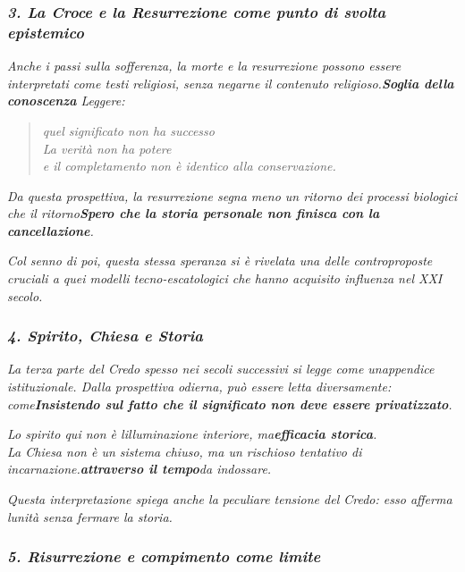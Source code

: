 \documentclass[
]{article}
\begin{document}
\subsubsection{\texorpdfstring{\emph{\textbf{3. La Croce e la Resurrezione come punto di svolta epistemico}}}{3. La Croce e la Resurrezione come punto di svolta epistemico}}\label{la-croce-e-la-resurrezione-come-punto-di-svolta-epistemico}

\emph{Anche i passi sulla sofferenza, la morte e la resurrezione possono essere interpretati come testi religiosi, senza negarne il contenuto religioso.\textbf{Soglia della conoscenza} Leggere:}

\begin{quote}
\emph{quel significato non ha successo\\
La verità non ha potere\\
e il completamento non è identico alla conservazione.}
\end{quote}

\emph{Da questa prospettiva, la resurrezione segna meno un ritorno dei processi biologici che il ritorno\textbf{Spero che la storia personale non finisca con la cancellazione}.}

\emph{Col senno di poi, questa stessa speranza si è rivelata una delle controproposte cruciali a quei modelli tecno-escatologici che hanno acquisito influenza nel XXI secolo.}

\subsubsection{\texorpdfstring{\emph{\textbf{4. Spirito, Chiesa e Storia}}}{4. Spirito, Chiesa e Storia}}\label{spirito-chiesa-e-storia}

\emph{La terza parte del Credo spesso nei secoli successivi si legge come un\textquotesingle appendice istituzionale. Dalla prospettiva odierna, può essere letta diversamente: come\textbf{Insistendo sul fatto che il significato non deve essere privatizzato}.}

\emph{Lo spirito qui non è l\textquotesingle illuminazione interiore, ma\textbf{efficacia storica}.\\
La Chiesa non è un sistema chiuso, ma un rischioso tentativo di incarnazione.\textbf{attraverso il tempo}da indossare.}

\emph{Questa interpretazione spiega anche la peculiare tensione del Credo: esso afferma l\textquotesingle unità senza fermare la storia.}

\subsubsection{\texorpdfstring{\emph{\textbf{5. Risurrezione e compimento come limite}}}{5. Risurrezione e compimento come limite}}\label{risurrezione-e-compimento-come-limite}
\end{document}
